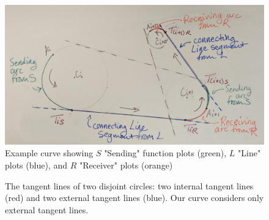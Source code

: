 \documentclass{article}
\begin{document}
\begin{figure}
    \centering
    \includegraphics[width=1.0\textwidth]{FigureXExampleOfSLR_Cropped.png}
    \caption{Example curve showing $S$ "Sending" function plots (green), $L$ "Line" plots (blue), and $R$ "Receiver" plots (orange)}
    \label{fig:SLRExample}
\end{figure}

\begin{figure}[htbp]
    \centering
    \caption{The tangent lines of two disjoint circles: two internal tangent lines (red) and two external tangent lines (blue). Our curve considers only external tangent lines.}
    \label{fig:external_tangents_only}
\end{figure}
\end{document}
